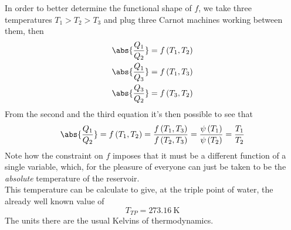 \documentclass[../qm.tex]{subfiles}
\begin{document}
In order to better determine the functional shape of $f$, we take three temperatures $T_1>T_2>T_3$ and plug three Carnot machines working between them, then
\begin{equation*}
	\begin{aligned}
		\abs{\frac{Q_1}{Q_2}}&= f\left( T_1, T_2 \right)\\
		\abs{\frac{Q_1}{Q_3}}&= f\left( T_1, T_3 \right)\\
		\abs{\frac{Q_3}{Q_2}}&= f\left( T_3, T_2 \right)
	\end{aligned}
\end{equation*}
From the second and the third equation it's then possible to see that
\begin{equation}
	\abs{\frac{Q_1}{Q_2}}=f\left( T_1, T_2 \right)=\frac{f\left( T_1, T_3 \right)}{f\left( T_2, T_3 \right)}=\frac{\psi\left( T_1 \right)}{\psi\left( T_2 \right)}=\frac{T_1}{T_2}
	\label{eq:abstemp.2nd}
\end{equation}
Note how the constraint on $f$ imposes that it must be a different function of a single variable, which, for the pleasure of everyone can just be taken to be the \textit{absolute} temperature of the reservoir.\\
This temperature can be calculate to give, at the triple point of water, the already well known value of 
\begin{equation}
	T_{TP}=273.16\ \mathrm{K}
	\label{eq:kelvindef.2nd}
\end{equation}
The units there are the usual Kelvins of thermodynamics.
\end{document}

